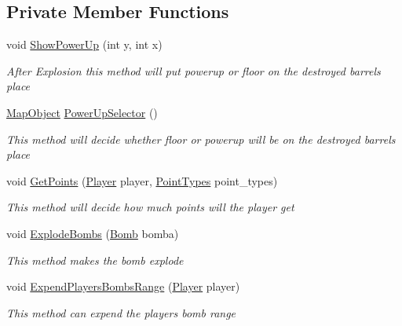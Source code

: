 \subsection*{Private Member Functions}
\begin{DoxyCompactItemize}
\item 
void \mbox{\hyperlink{class_bomberman_1_1_business_logic_1_1_game_logic_a378d4ec5e7f170f0cd24de08ffdb5928}{Show\+Power\+Up}} (int y, int x)
\begin{DoxyCompactList}\small\item\em After Explosion this method will put powerup or floor on the destroyed barrels place \end{DoxyCompactList}\item 
\mbox{\hyperlink{class_bomberman_1_1_model_1_1_map_object}{Map\+Object}} \mbox{\hyperlink{class_bomberman_1_1_business_logic_1_1_game_logic_a8017ab77c9085d822dc17b0ad664052f}{Power\+Up\+Selector}} ()
\begin{DoxyCompactList}\small\item\em This method will decide whether floor or powerup will be on the destroyed barrels place \end{DoxyCompactList}\item 
void \mbox{\hyperlink{class_bomberman_1_1_business_logic_1_1_game_logic_ae2dc494b30a42358976a4fc3ce192435}{Get\+Points}} (\mbox{\hyperlink{class_bomberman_1_1_model_1_1_player}{Player}} player, \mbox{\hyperlink{namespace_bomberman_1_1_model_ae2cd98abbbc849107bf2802cb1e7a8a3}{Point\+Types}} point\+\_\+types)
\begin{DoxyCompactList}\small\item\em This method will decide how much points will the player get \end{DoxyCompactList}\item 
void \mbox{\hyperlink{class_bomberman_1_1_business_logic_1_1_game_logic_a05daa619b4b1b7f5cc0fdbe3351fde57}{Explode\+Bombs}} (\mbox{\hyperlink{class_bomberman_1_1_model_1_1_bomb}{Bomb}} bomba)
\begin{DoxyCompactList}\small\item\em This method makes the bomb explode \end{DoxyCompactList}\item 
void \mbox{\hyperlink{class_bomberman_1_1_business_logic_1_1_game_logic_a10cc00c77892547f704066daa8e3b211}{Expend\+Players\+Bombs\+Range}} (\mbox{\hyperlink{class_bomberman_1_1_model_1_1_player}{Player}} player)
\begin{DoxyCompactList}\small\item\em This method can expend the players bomb range \end{DoxyCompactList}\item 

\end{DoxyCompactItemize}
